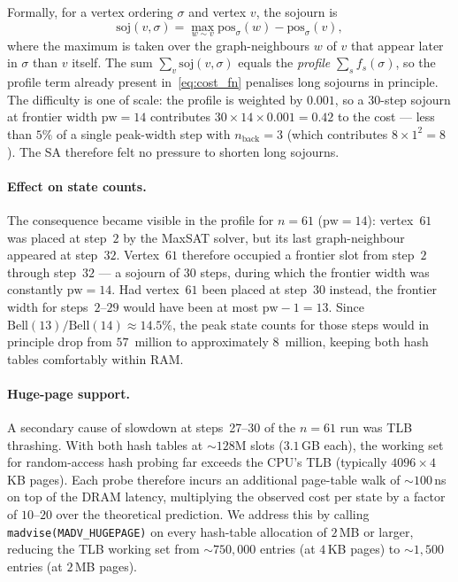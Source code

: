 \documentclass[12pt]{article}
\theoremstyle{definition}
\newcommand{\pw}{\mathrm{pw}}
\newcommand{\Bell}{\mathrm{Bell}}
\newcommand{\nb}{n_{\mathrm{back}}}
\begin{document}
Formally, for a vertex ordering $\sigma$ and vertex $v$, the sojourn is
\[
  \mathrm{soj}(v,\sigma)
  = \max_{w \sim v} \mathrm{pos}_\sigma(w) - \mathrm{pos}_\sigma(v),
\]
where the maximum is taken over the graph-neighbours $w$ of $v$ that
appear later in $\sigma$ than $v$ itself.
The sum $\sum_v \mathrm{soj}(v,\sigma)$ equals the
\emph{profile} $\sum_s f_s(\sigma)$, so the profile term already
present in~\eqref{eq:cost_fn} penalises long sojourns in principle.
The difficulty is one of scale: the profile is
weighted by $0.001$, so a 30-step sojourn at frontier width
$\pw = 14$ contributes $30 \times 14 \times 0.001 = 0.42$ to the
cost — less than $5\%$ of a single peak-width step with
$\nb = 3$ (which contributes $8 \times 1^2 = 8$).
The SA therefore felt no pressure to shorten long sojourns.

\paragraph{Effect on state counts.}
The consequence became visible in the profile for $n = 61$
($\pw = 14$): vertex~$61$ was placed at step~$2$ by the MaxSAT
solver, but its last graph-neighbour appeared at step~$32$.
Vertex~$61$ therefore occupied a frontier slot from step~$2$ through
step~$32$ — a sojourn of $30$ steps, during which the frontier width
was constantly $\pw = 14$.
Had vertex~$61$ been placed at step~$30$ instead, the frontier width
for steps~$2$--$29$ would have been at most $\pw - 1 = 13$.
Since $\Bell(13)/\Bell(14) \approx 14.5\%$, the peak state counts
for those steps would in principle drop from $57$~million to
approximately $8$~million, keeping both hash tables comfortably within RAM.

\paragraph{Huge-page support.}
A secondary cause of slowdown at steps~27--30 of the $n=61$ run
was TLB thrashing.
With both hash tables at ${\sim}128\text{M}$ slots ($3.1$\,GB each),
the working set for random-access hash probing far exceeds the
CPU's TLB (typically $4096\times 4$\,KB pages).
Each probe therefore incurs an additional page-table walk of
${\sim}100$\,ns on top of the DRAM latency, multiplying the observed
cost per state by a factor of $10$--$20$ over the theoretical
prediction.
We address this by calling \texttt{madvise(MADV\_HUGEPAGE)} on every
hash-table allocation of $2$\,MB or larger, reducing the TLB working
set from ${\sim}750{,}000$ entries (at $4$\,KB pages) to
${\sim}1{,}500$ entries (at $2$\,MB pages).
\end{document}
